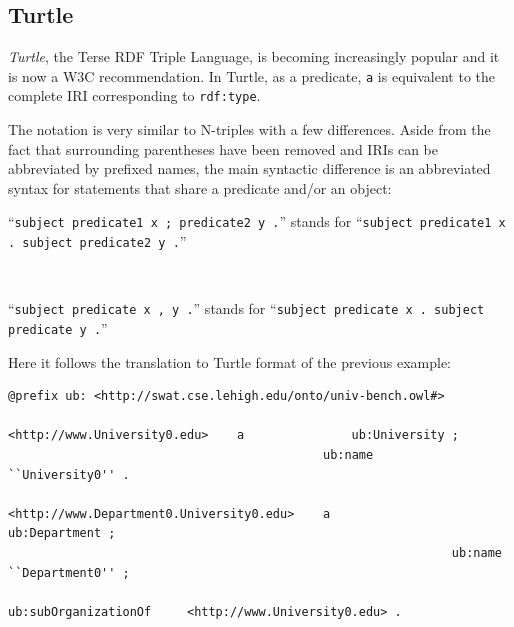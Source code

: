 \documentclass[10pt, a4paper]{report}
\begin{document}
\subsection{Turtle}

\label{subsection:turtle}

\textit{Turtle}, the Terse RDF Triple Language, is becoming increasingly popular and it is now a W3C recommendation. In Turtle, as a predicate, \texttt{a} is equivalent to the complete IRI corresponding to \texttt{rdf:type}.

The notation is very similar to N-triples with a few differences. Aside from the fact that surrounding parentheses have been removed and IRIs can be abbreviated by prefixed names, the main syntactic difference is an abbreviated syntax for statements that share a predicate and/or an object: \\

\begin{itemize}
	\begin{minipage}{0.92\textwidth}
		\item
		``\texttt{subject predicate1 x ; predicate2 y .}'' stands for ``\texttt{subject predicate1 x . subject predicate2 y .}'' \\
	\end{minipage} \\
	\begin{minipage}{0.92\textwidth}
		\item
		``\texttt{subject predicate x , y .}'' stands for ``\texttt{subject predicate x . subject predicate y .}'' \\
	\end{minipage}
\end{itemize}

Here it follows the translation to Turtle format of the previous example: \\

\begin{minipage}{0.92\textwidth}
	\lstset{language=turtle}
	\begin{lstlisting}
@prefix ub: <http://swat.cse.lehigh.edu/onto/univ-bench.owl#>

<http://www.University0.edu>    a               ub:University ;
                                            ub:name      ``University0'' .
                                
<http://www.Department0.University0.edu>    a                               ub:Department ;
                                                              ub:name                      ``Department0'' ;
                                                              ub:subOrganizationOf     <http://www.University0.edu> .
                \end{lstlisting}
\end{minipage} \\
\\
\end{document}
